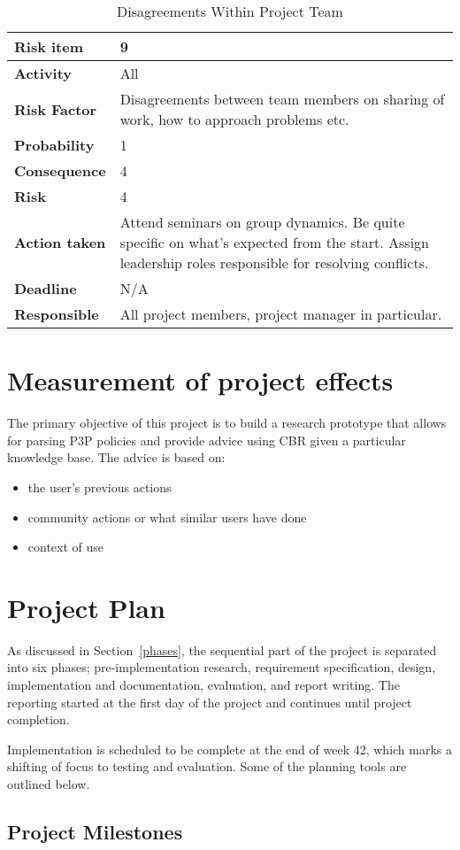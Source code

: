 \begin{table}[htdp]
\caption{Disagreements Within Project Team}
\begin{center}
\begin{tabularx}{\textwidth}{| X | X |}
\hline
\textbf{Risk item} & 9 \\
\hline
\textbf{Activity} & All \\
\hline
\textbf{Risk Factor} & Disagreements between team members on sharing of work, how to approach problems etc. \\
\hline
\textbf{Probability} & 1 \\
\hline
\textbf{Consequence} & 4 \\
\hline
\textbf{Risk} & 4 \\
\hline
\textbf{Action taken} & Attend seminars on group dynamics. Be quite specific on what's expected from the start. Assign leadership roles responsible for resolving conflicts. \\
\hline
\textbf{Deadline} & N/A \\
\hline
\textbf{Responsible} & All project members, project manager in particular. \\
\hline
\end{tabularx}
\end{center}
\label{risk_9}
\end{table}


\section{Measurement of project effects}
The primary objective of this project is to build a research prototype that allows for parsing P3P policies and provide advice using CBR given a particular knowledge base. The advice is based on: 

\begin{itemize}
\item the user's previous actions
\item community actions or what similar users have done
\item context of use
\end{itemize}
   

\section{Project Plan}
As discussed in Section~\ref{phases}, the sequential part of the project is separated into six phases; pre-implementation research, requirement specification, design, implementation and documentation, evaluation, and report writing. The reporting started at the first day of the project and continues until project completion. 

Implementation is scheduled to be complete at the end of week 42, which marks a shifting of focus to testing and evaluation. Some of the planning tools are outlined below.

\subsection{Project Milestones}



\newpage




